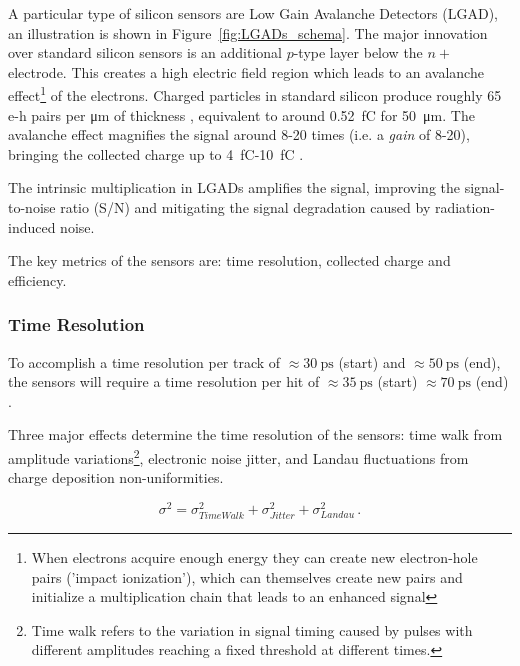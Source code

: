 A particular type of silicon sensors are Low Gain Avalanche Detectors (LGAD), an illustration is shown in Figure~\ref{fig:LGADs_schema}. The major innovation over standard silicon sensors is an additional \(p\)-type layer below the \(n+\) electrode. This creates a high electric field region which leads to an avalanche effect\footnote[2]{When electrons acquire enough energy they can create new electron-hole pairs ('impact ionization'), which can themselves create new pairs and initialize a multiplication chain that leads to an enhanced signal} of the electrons. 
Charged particles in standard silicon produce roughly 65 e-h pairs per \unit{\micro\meter} of thickness \cite{meroli_energy_loss2011}, equivalent to around \qty{0.52}{\femto\coulomb} for \qty{50}{\micro\meter}. The avalanche effect magnifies the signal around 8-20 times (i.e. a \textit{gain} of 8-20), bringing the collected charge up to \qty{4}{\femto\coulomb}-\qty{10}{\femto\coulomb} \cite{cernTechnicalDesign}. %

The intrinsic multiplication in LGADs amplifies the signal, improving the signal-to-noise ratio (S/N) and mitigating the signal degradation caused by radiation-induced noise.

The key metrics of the sensors are: time resolution, collected charge and efficiency.

\subsubsection{Time Resolution}

To accomplish a time resolution per track of \(\approx\qty{30}{\pico\second}\) (start) and \(\approx\qty{50}{\pico\second}\) (end), the sensors will require a time resolution per hit of \(\approx\qty{35}{\pico\second}\) (start) \(\approx\qty{70}{\pico\second}\) (end) \cite{CERN-LHCC-2020-007}.

Three major effects determine the time resolution of the sensors: time walk from amplitude variations\footnote{Time walk refers to the variation in signal timing caused by pulses with different amplitudes reaching a fixed threshold at different times.}, electronic noise jitter, and Landau fluctuations from charge deposition non-uniformities. 

\begin{equation}\label{eq:time_resoltuion_LGADs}
    \sigma^2 = \sigma_{TimeWalk}^2 + \sigma_{Jitter}^2 + \sigma_{Landau}^2  \, .
\end{equation}

